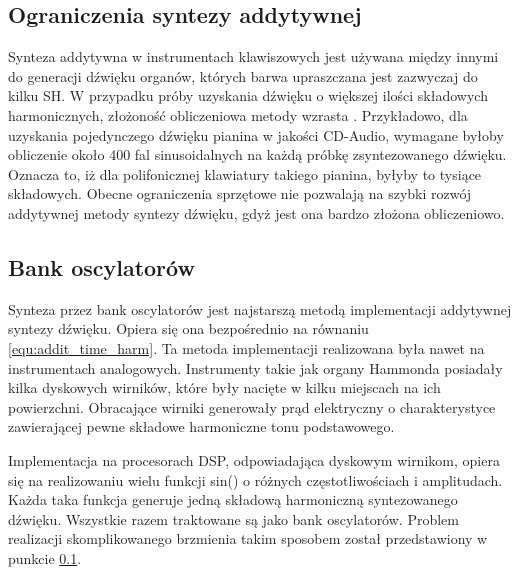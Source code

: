 \subsection{Ograniczenia syntezy addytywnej} \label{addit_ograniczenia}
Synteza addytywna w instrumentach klawiszowych jest używana między innymi do generacji dźwięku organów, których barwa upraszczana jest zazwyczaj do kilku SH. W przypadku próby uzyskania dźwięku o większej ilości składowych harmonicznych, złożoność obliczeniowa metody wzrasta \cite{add_ograniczenia}.
Przykładowo, dla uzyskania pojedynczego dźwięku pianina w jakości CD-Audio,
wymagane byłoby obliczenie około 400 fal sinusoidalnych na każdą próbkę zsyntezowanego dźwięku. Oznacza to, iż dla polifonicznej klawiatury takiego pianina, byłyby to tysiące składowych. Obecne ograniczenia sprzętowe nie pozwalają na szybki rozwój addytywnej metody syntezy dźwięku, gdyż jest ona bardzo złożona obliczeniowo.

\subsection{Bank oscylatorów}
Synteza przez bank oscylatorów jest najstarszą metodą implementacji addytywnej syntezy dźwięku. Opiera się ona bezpośrednio na równaniu \ref{equ:addit_time_harm}.
Ta metoda implementacji realizowana była nawet na instrumentach analogowych. Instrumenty takie jak organy Hammonda posiadały kilka dyskowych wirników, które były nacięte w kilku miejscach na ich powierzchni. Obracające wirniki generowały prąd elektryczny o charakterystyce zawierającej pewne składowe harmoniczne tonu podstawowego.

Implementacja na procesorach DSP, odpowiadająca dyskowym wirnikom, opiera się na realizowaniu wielu funkcji sin() o różnych częstotliwościach i amplitudach. Każda taka funkcja generuje jedną składową harmoniczną syntezowanego dźwięku. Wszystkie razem traktowane są jako bank oscylatorów. Problem realizacji skomplikowanego brzmienia takim sposobem został przedstawiony w punkcie \ref{addit_ograniczenia}.

